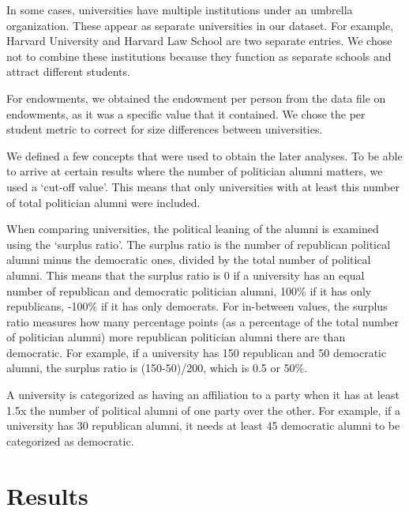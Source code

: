\documentclass{article}
\begin{document}
In some cases, universities have multiple institutions under an umbrella organization. These appear as separate universities in our dataset. For example, Harvard University and Harvard Law School are two separate entries. We chose not to combine these institutions because they function as separate schools and attract different students.

For endowments, we obtained the endowment per person from the data file on endowments, as it was a specific value that it contained. We chose the per student metric to correct for size differences between universities.

We defined a few concepts that were used to obtain the later analyses. To be able to arrive at certain results where the number of politician alumni matters, we used a ‘cut-off value’. This means that only universities with at least this number of total politician alumni were included.

When comparing universities, the political leaning of the alumni is examined using the ‘surplus ratio’. The surplus ratio is the number of republican political alumni minus the democratic ones, divided by the total number of political alumni. This means that the surplus ratio is 0 if a university has an equal number of republican and democratic politician alumni, 100\% if it has only republicans, -100\% if it has only democrats. For in-between values, the surplus ratio measures how many percentage points (as a percentage of the total number of politician alumni) more republican politician alumni there are than democratic. For example, if a university has 150 republican and 50 democratic alumni, the surplus ratio is (150-50)/200, which is 0.5 or 50\%.

A university is categorized as having an affiliation to a party when it has at least 1.5x the number of political alumni of one party over the other. For example, if a university has 30 republican alumni, it needs at least 45 democratic alumni to be categorized as democratic.


\section{Results}
\end{document}
